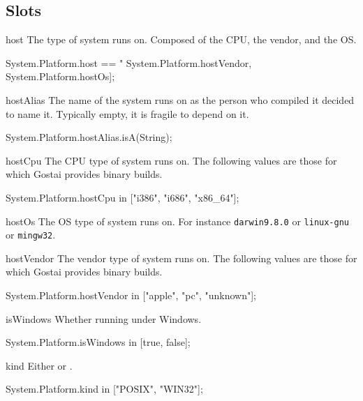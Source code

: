 \subsection{Slots}
\begin{urbiscriptapi}
\item[host] The type of system \usdk runs on.  Composed of the CPU, the
  vendor, and the OS.
\begin{urbiassert}
System.Platform.host ==
  "%
                System.Platform.hostVendor,
                System.Platform.hostOs];
\end{urbiassert}

\item[hostAlias] The name of the system \usdk runs on as the person who
  compiled it decided to name it.  Typically empty, it is fragile to depend
  on it.
\begin{urbiassert}
System.Platform.hostAlias.isA(String);
\end{urbiassert}

\item[hostCpu] The CPU type of system \usdk runs on.  The following values
  are those for which Gostai provides binary builds.
\begin{urbiassert}
System.Platform.hostCpu in ["i386", "i686", "x86_64"];
\end{urbiassert}

\item[hostOs] The OS type of system \usdk runs on.  For instance
  \lstinline|darwin9.8.0| or \lstinline|linux-gnu| or \lstinline|mingw32|.

\item[hostVendor] The vendor type of system \usdk runs on.  The following
  values are those for which Gostai provides binary builds.
\begin{urbiassert}
System.Platform.hostVendor in ["apple", "pc", "unknown"];
\end{urbiassert}

\item[isWindows] Whether running under Windows.
\begin{urbiassert}
System.Platform.isWindows in [true, false];
\end{urbiassert}

\item[kind] Either  or .
\begin{urbiassert}
System.Platform.kind in ["POSIX", "WIN32"];
\end{urbiassert}
\end{urbiscriptapi}

